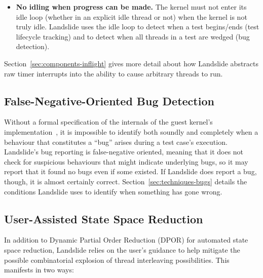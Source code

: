 {\begin{itemize}
	Landslide treats the sleep queue no differently from the runqueue when deciding which threads are runnable. The guest kernel will treat it differently, but since sleeping for a predetermined amount of time is never an appropriate way to solve race conditions, Landslide treats sleeping threads as notionally runnable. This fits directly into its model that runnable threads are ones that can be caused to run with a finite number of timer ticks in succession.
	\item {\bf No idling when progress can be made.} The kernel must not enter its idle loop (whether in an explicit idle thread or not) when the kernel is not truly idle. Landslide uses the idle loop to detect when a test begins/ends (test lifecycle tracking) and to detect when all threads in a test are wedged (bug detection).
\end{itemize}

Section~\ref{sec:components-inflight} gives more detail about how Landslide abstracts raw timer interrupts into the ability to cause arbitrary threads to run.

\subsection{False-Negative-Oriented Bug Detection}
\label{sec:model-bugs}

Without a formal specification of the internals of the guest kernel's implementation~\cite{sel4}, it is impossible to identify both soundly and completely when a behaviour that constitutes a ``bug'' arises during a test case's execution.
Landslide's bug reporting is false-negative oriented, meaning that it does not check for suspicious behaviours that might indicate underlying bugs, so it may report that it found no bugs even if some existed. If Landslide does report a bug, though, it is almost certainly correct. Section~\ref{sec:techniques-bugs} details the conditions Landslide uses to identify when something has gone wrong.

\subsection{User-Assisted State Space Reduction}
\label{sec:model-user}

In addition to Dynamic Partial Order Reduction (DPOR) for automated state space reduction, Landslide relies on the user's guidance to help mitigate the possible combinatorial explosion of thread interleaving possibilities. This manifests in two ways:

}
